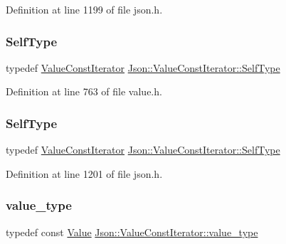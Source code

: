 Definition at line 1199 of file json.\+h.

\hypertarget{class_json_1_1_value_const_iterator_a0c2e33e7eb5a80dd8709fb28ece83933}{}\label{class_json_1_1_value_const_iterator_a0c2e33e7eb5a80dd8709fb28ece83933} 
\subsubsection{\texorpdfstring{Self\+Type}{SelfType}\hspace{0.1cm}{\footnotesize\ttfamily [1/2]}}
{\footnotesize\ttfamily typedef \hyperlink{class_json_1_1_value_const_iterator}{Value\+Const\+Iterator} \hyperlink{class_json_1_1_value_const_iterator_a0c2e33e7eb5a80dd8709fb28ece83933}{Json\+::\+Value\+Const\+Iterator\+::\+Self\+Type}}



Definition at line 763 of file value.\+h.

\hypertarget{class_json_1_1_value_const_iterator_a0c2e33e7eb5a80dd8709fb28ece83933}{}\label{class_json_1_1_value_const_iterator_a0c2e33e7eb5a80dd8709fb28ece83933} 
\subsubsection{\texorpdfstring{Self\+Type}{SelfType}\hspace{0.1cm}{\footnotesize\ttfamily [2/2]}}
{\footnotesize\ttfamily typedef \hyperlink{class_json_1_1_value_const_iterator}{Value\+Const\+Iterator} \hyperlink{class_json_1_1_value_const_iterator_a0c2e33e7eb5a80dd8709fb28ece83933}{Json\+::\+Value\+Const\+Iterator\+::\+Self\+Type}}



Definition at line 1201 of file json.\+h.

\hypertarget{class_json_1_1_value_const_iterator_aa5f1707dcef4bfe73e23ddc14dbe760d}{}\label{class_json_1_1_value_const_iterator_aa5f1707dcef4bfe73e23ddc14dbe760d} 
\subsubsection{\texorpdfstring{value\+\_\+type}{value\_type}\hspace{0.1cm}{\footnotesize\ttfamily [1/2]}}
{\footnotesize\ttfamily typedef const \hyperlink{class_json_1_1_value}{Value} \hyperlink{class_json_1_1_value_const_iterator_aa5f1707dcef4bfe73e23ddc14dbe760d}{Json\+::\+Value\+Const\+Iterator\+::value\+\_\+type}}



